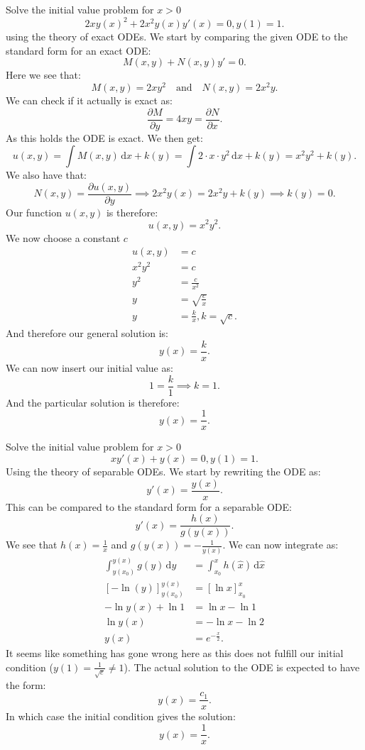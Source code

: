 \documentclass[a4paper]{article}
\begin{document}
Solve the initial value problem for $x > 0$
\[ 
2xy(x)^2 + 2x^2y(x)y'(x) = 0, y(1) = 1
.\]
using the theory of exact ODEs.
\bigbreak
We start by comparing the given ODE to the standard form for an exact ODE:
\[ 
M(x,y) + N(x,y)y' = 0
.\]
Here we see that:
\[ 
M(x,y) = 2xy^2 \quad \text{and} \quad N(x,y) = 2x^2 y
.\]
We can check if it actually is exact as:
\[ 
\frac{\partial M}{\partial y} = 4xy = \frac{\partial N}{\partial x}
.\]
As this holds the ODE is exact. We then get:
\[ 
u(x,y) = \int M(x,y) \, \mathrm{d}x + k(y) = \int 2 \cdot x \cdot y^2 \, \mathrm{d}x + k(y) = x^2 y^2 + k(y)
.\]
We also have that:
\[ 
N(x,y) = \frac{\partial u(x,y)}{\partial y} \implies 2x^2 y(x) = 2x^2 y + k(y) \implies k(y) = 0
.\]
Our function $u(x,y)$ is therefore:
\[ 
u(x,y) = x^2 y^2
.\]
We now choose a constant $c$
\begin{align*}
  u(x,y) &= c \\
  x^2 y^2 &= c \\
  y^2 &= \frac{c}{x^2} \\
  y &= \sqrt{\frac{c}{x}} \\
  y &= \frac{k}{x}, k = \sqrt{c}
.\end{align*}
And therefore our general solution  is:
\[ 
y(x) = \frac{k}{x}
.\]
We can now insert our initial value as:
\[ 
1 = \frac{k}{1} \implies k = 1
.\]
And the particular solution is therefore:
\[ 
y(x) = \frac{1}{x}
.\]


Solve the initial value problem for $x > 0$
\[ 
xy'(x) + y(x) = 0, y(1) = 1
.\]
Using the theory of separable ODEs.
\bigbreak
We start by rewriting the ODE as:
\[ 
y'(x) =  \frac{y(x)}{x}
.\]
This can be compared to the standard form for a separable ODE:
\[ 
y'(x) = \frac{h(x)}{g(y(x))}
.\]
We see that $h(x) = \frac{1}{x}$ and $g(y(x)) = - \frac{1}{y(x)}$. We can now integrate as:
\begin{align*}
  \int_{y(x_0)}^{y(x)} g(y) \, \mathrm{d}y &= \int_{x_0}^{x} h(\hat{x}) \, \mathrm{d}\hat{x} \\
  \left[ -\ln (y) \right]_{y(x_0)}^{y(x)} &= \left[ \ln x \right]_{x_0}^{x} \\
  - \ln y(x) + \ln 1 &= \ln x - \ln 1 \\
  \ln y(x) &= - \ln x - \ln 2 \\
  y(x) &= e^{-\frac{x}{2}}
.\end{align*}
It seems like something has gone wrong here as this does not fulfill our initial condition ($y(1) = \frac{1}{\sqrt{e}} \neq 1$). The actual solution to the ODE is expected to have the form:
\[ 
y(x) = \frac{c_1}{x}
  .\]
In which case the initial condition gives the solution:
\[ 
y(x) = \frac{1}{x}
.\]
\end{document}
